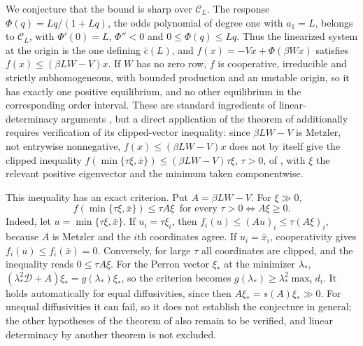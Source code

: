 We conjecture that the bound is sharp over $\mathcal C_L$. The response $\Phi(q)=Lq/(1+Lq)$, the odds polynomial of degree one with $a_1=L$, belongs to $\mathcal C_L$, with $\Phi'(0)=L$, $\Phi''<0$ and $0\le\Phi(q)\le Lq$. Thus the linearized system at the origin is the one defining $\bar c(L)$, and $f(x)=-Vx+\Phi(\beta Wx)$ satisfies $f(x)\le(\beta LW-V)x$. If $W$ has no zero row, $f$ is cooperative, irreducible and strictly subhomogeneous, with bounded production and an unstable origin, so it has exactly one positive equilibrium, and no other equilibrium in the corresponding order interval. These are standard ingredients of linear-determinacy arguments \cite{WeinbergerLewisLi2002,Li2012}, but a direct application of the theorem of \cite{Li2012} additionally requires verification of its clipped-vector inequality: since $\beta LW-V$ is Metzler, not entrywise nonnegative, $f(x)\le(\beta LW-V)x$ does not by itself give the clipped inequality $f(\min\{\tau\xi,\bar x\})\le(\beta LW-V)\tau\xi$, $\tau>0$, of \cite{Li2012}, with $\xi$ the relevant positive eigenvector and the minimum taken componentwise.

This inequality has an exact criterion. Put $A=\beta LW-V$. For $\xi\gg0$,
\[
 f(\min\{\tau\xi,\bar x\})\le\tau A\xi\ \text{ for every }\tau>0\iff A\xi\ge0.
\]
Indeed, let $u=\min\{\tau\xi,\bar x\}$. If $u_i=\tau\xi_i$, then $f_i(u)\le(Au)_i\le\tau(A\xi)_i$, because $A$ is Metzler and the $i$th coordinates agree. If $u_i=\bar x_i$, cooperativity gives $f_i(u)\le f_i(\bar x)=0$. Conversely, for large $\tau$ all coordinates are clipped, and the inequality reads $0\le\tau A\xi$. For the Perron vector $\xi_*$ at the minimizer $\lambda_*$, $(\lambda_*^2\mathcal D+A)\xi_*=g(\lambda_*)\xi_*$, so the criterion becomes $g(\lambda_*)\ge\lambda_*^2\max_id_i$. It holds automatically for equal diffusivities, since then $A\xi_*=s(A)\xi_*\gg0$. For unequal diffusivities it can fail, so it does not establish the conjecture in general; the other hypotheses of the theorem of \cite{Li2012} also remain to be verified, and linear determinacy by another theorem is not excluded.

